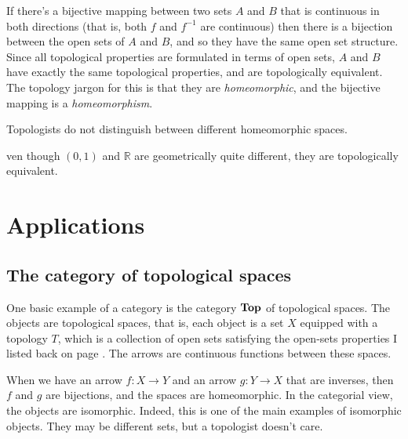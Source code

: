 \documentclass{article}
\def\R{{\mathbb R}}
\def\cat#1{{\bf #1}}
\newcounter{exercisecounter}\setcounter{exercisecounter}{1}
\def\Exercise.#1\par{{\item\small \makebox{\bf Exercise \number\theexercisecounter.\hspace{0.5em}}\unskip\ignorespaces#1\addtocounter{exercisecounter}{1}}}
\begin{document}
If there's a bijective mapping between two sets $A$ and $B$ that is
continuous in both directions (that is, both $f$ and $f^{-1}$ are
continuous) then there is a bijection between the open sets of $A$ and
$B$, and so they have the same open set structure.  Since all
topological properties are formulated in terms of open sets, $A$ and
$B$ have exactly the same topological properties, and are
topologically equivalent.  The topology jargon for this is that they
are {\em homeomorphic\/}, and the bijective mapping is a {\em 
homeomorphism\/}. 

Topologists do not distinguish between different homeomorphic
spaces.

\begin{itemize}
\Exercise.  Even though $(0,1)$ and $\R$ are geometrically quite
different, they are topologically equivalent.

\end{itemize}

\section*{Applications}

\subsection*{The category of topological spaces}

One basic example of a category is the category $\cat{Top}$ of
topological spaces.  The objects are topological spaces, that is, each
object is a set $X$ equipped with a topology $T$, which is a
collection of open sets satisfying the open-sets properties I listed
back on page \pageref{topology-def}.  The arrows are continuous
functions between these spaces.

When we have an arrow $f : X\to Y$ and an arrow $g : Y\to X$ that are
inverses, then $f$ and $g$ are bijections, and the spaces are
homeomorphic.  In the categorial view, the objects are isomorphic.
Indeed, this is one of the main examples of isomorphic objects.  They
may be different sets, but a topologist doesn't care.  

\end{document}
